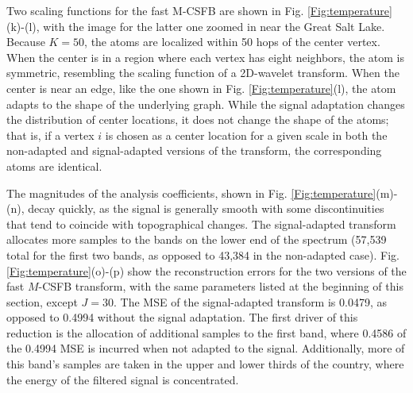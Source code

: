\documentclass[journal, 10pt]{IEEEtran}
\begin{document}
Two scaling functions for the fast M-CSFB are shown in Fig. \ref{Fig:temperature}(k)-(l), with the image for the latter one zoomed in near the Great Salt Lake. Because $K=50$, the atoms are localized within 50 hops of the center vertex. When the center is in a region where each vertex has eight neighbors, the atom is symmetric, resembling the scaling function of a 2D-wavelet transform. When the center is near an edge, like the one shown in Fig. \ref{Fig:temperature}(l), the atom adapts to the shape of the underlying graph. While %
the signal adaptation changes the distribution of center locations, it does not change the shape of the atoms; that is, if a vertex $i$ is chosen as a center location for a given scale in both the non-adapted and signal-adapted versions of the transform, the corresponding atoms are identical. 

The magnitudes of the analysis coefficients, shown in Fig. \ref{Fig:temperature}(m)-(n), decay quickly, %
as the signal is generally smooth with some discontinuities that tend to coincide with topographical changes. %
The signal-adapted transform allocates more samples to the bands on the lower end of the spectrum (57,539 total for the first two bands, as opposed to 43,384 in the non-adapted case).
Fig. \ref{Fig:temperature}(o)-(p) show the reconstruction errors for the two versions of the fast $M$-CSFB transform, with the same parameters listed at the beginning of this section, except $J=30$. The MSE of the signal-adapted transform is 0.0479, as opposed to 0.4994 without the signal adaptation. The first driver of this reduction is the allocation of additional samples to the first band, where 0.4586 of the 0.4994 MSE is incurred when not adapted to the signal. Additionally, more of this band's samples %
are taken in the upper and lower thirds of the country, where the energy of the filtered signal is concentrated. 

\end{document}

